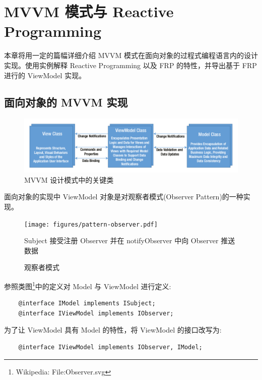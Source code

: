 \chapter{MVVM 模式与 Reactive Programming}

本章将用一定的篇幅详细介绍 MVVM 模式在面向对象的过程式编程语言内的设计实现。使用实例解释 Reactive Programming 以及 FRP 的特性，并导出基于 FRP 进行的 ViewModel 实现。

\section{面向对象的 MVVM 实现}

\begin{figure}[!h]
  \begin{center}
    \includegraphics[scale=0.5]{figures/diagram-mvvm-pattern-ref.png}
    \caption{MVVM 设计模式中的关键类~\cite{ghoda2012windows}\label{MVVMCoreClasses}}
  \end{center}
\end{figure}

面向对象的实现中 ViewModel 对象是对观察者模式(Observer Pattern)的一种实现。

\begin{figure}[!h]
  \begin{center}
    \texttt{[image: figures/pattern-observer.pdf]}
    \caption{观察者模式\label{PatternObserver}}
    Subject 接受注册 Observer 并在 notifyObserver 中向 Observer 推送数据
  \end{center}
\end{figure}

参照类图\footnote{Wikipedia: File:Observer.svg}中的定义对 Model 与 ViewModel 进行定义:

\begin{verbatim}
    @interface IModel implements ISubject;
    @interface IViewModel implements IObserver;
\end{verbatim}

为了让 ViewModel 具有 Model 的特性，将 ViewModel 的接口改写为:

\begin{verbatim}
    @interface IViewModel implements IObserver, IModel;
\end{verbatim}

